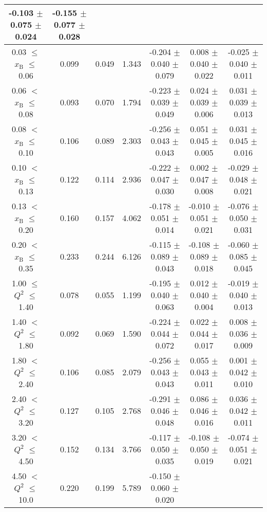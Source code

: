 {\begin{table}[width=15cm]
\begin{center}
{\begin{tabular}{|c|c|c|c|c|c|c|}
-0.103  $\pm$  0.075   $\pm$  0.024 & -0.155 $\pm$   0.077  $\pm$   0.028\\
\hline
0.03 $\leqslant$ $x_{\textrm{B}}$ $\leqslant$ 0.06 &  0.099 & 0.049 & 1.343 & -0.204  $\pm$  0.040  $\pm$   0.079 &
0.008 $\pm$   0.040  $\pm$   0.022 & -0.025  $\pm$  0.040  $\pm$  0.011 \\ 
0.06 $<$ $x_{\textrm{B}}$ $\leqslant$ 0.08 &  0.093 & 0.070 &  1.794 &  -0.223 $\pm$  0.039  $\pm$   0.049 &
0.024  $\pm$  0.039  $\pm$   0.006 & 0.031 $\pm$   0.039  $\pm$   0.013\\
0.08 $<$ $x_{\textrm{B}}$ $\leqslant$ 0.10 &  0.106 & 0.089 &  2.303 &  -0.256 $\pm$   0.043  $\pm$   0.043 &
0.051 $\pm$   0.045  $\pm$   0.005 & 0.031  $\pm$  0.045  $\pm$   0.016\\
0.10 $<$ $x_{\textrm{B}}$ $\leqslant$ 0.13 &  0.122 &  0.114 &  2.936 &  -0.222 $\pm$   0.047  $\pm$   0.030 &
0.002  $\pm$  0.047 $\pm$    0.008 & -0.029 $\pm$ 0.048  $\pm$   0.021\\
0.13 $<$ $x_{\textrm{B}}$ $\leqslant$ 0.20 &  0.160 & 0.157 &  4.062 &  -0.178 $\pm$   0.051  $\pm$   0.014 &
-0.010  $\pm$  0.051 $\pm$    0.021 & -0.076 $\pm$   0.050  $\pm$   0.031\\
0.20 $<$ $x_{\textrm{B}}$ $\leqslant$ 0.35 &  0.233 & 0.244 &  6.126 &  -0.115  $\pm$  0.089 $\pm$    0.043 &
-0.108  $\pm$  0.089  $\pm$   0.018 & -0.060 $\pm$  0.085 $ \pm$  0.045\\
\hline
1.00 $\leqslant$ $Q^{2}$ $\leqslant$ 1.40 &  0.078 & 0.055  & 1.199  &  -0.195  $\pm$  0.040  $\pm$   0.063 &
0.012 $\pm$   0.040  $\pm$   0.004 & -0.019  $\pm$  0.040  $\pm$   0.013\\
1.40 $<$ $Q^{2}$ $\leqslant$ 1.80 &  0.092 & 0.069 &  1.590  &  -0.224  $\pm$  0.044  $\pm$   0.072 &
0.022 $\pm$  0.044  $\pm$   0.017 & 0.008 $\pm$   0.036  $\pm$   0.009\\
1.80 $<$ $Q^{2}$ $\leqslant$ 2.40 &  0.106 & 0.085 &  2.079  &  -0.256 $\pm$  0.043  $\pm$   0.043 &
0.055 $\pm$   0.043  $\pm$   0.011 & 0.001  $\pm$  0.042  $\pm$   0.010\\
2.40 $<$ $Q^{2}$ $\leqslant$ 3.20 &  0.127 & 0.105  & 2.768  &  -0.291  $\pm$  0.046   $\pm$  0.048 & 
0.086  $\pm$  0.046  $\pm$   0.016 & 0.036  $\pm$  0.042  $\pm$   0.011\\
3.20 $<$ $Q^{2}$ $\leqslant$ 4.50 &  0.152 & 0.134 &  3.766  &  -0.117  $\pm$  0.050  $\pm$   0.035 &
-0.108  $\pm$  0.050  $\pm$   0.019 & -0.074  $\pm$  0.051  $\pm$   0.021 \\
4.50 $<$ $Q^{2}$ $\leqslant$ 10.0 &  0.220 & 0.199 &  5.789  &  -0.150 $\pm$ 0.060  $\pm$   0.020 &

\end{tabular}}
\end{center}
\end{table}}

